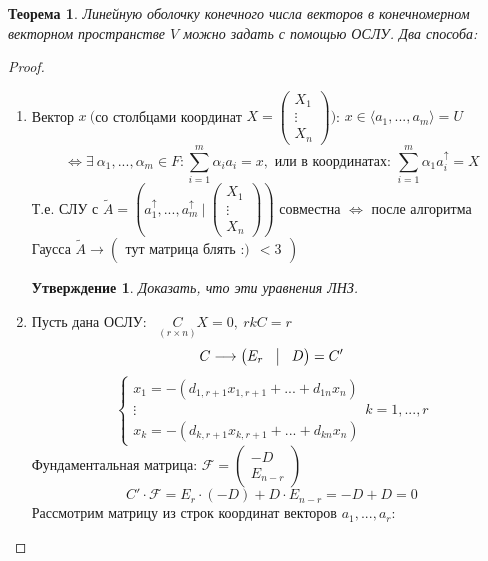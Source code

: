 \documentclass[a4paper, 12pt]{article}
\theoremstyle{definition}
\theoremstyle{plain}
\newtheorem*{theorem}{Теорема}
\newtheorem*{subtheorem}{Утверждение}
\theoremstyle{remark}
\begin{document}
  \begin{theorem}
    Линейную оболочку конечного числа векторов в конечномерном векторном пространстве $V$ можно задать с помощью ОСЛУ. Два способа:
  \end{theorem}
  \begin{proof}
    \begin{enumerate}
      \item Вектор $x \ ($со столбцами координат $X = \begin{pmatrix}
        X_1 \\ \vdots \\ X_n
      \end{pmatrix})$: $x \in \langle a_1,...,a_m \rangle = U$ 
      $$ \Longleftrightarrow \exists \ \alpha_1,...,\alpha_m \in F :  \sum \limits_{i=1}^m \alpha_i a_i = x,  \text{ или в координатах: } \sum \limits_{i=1}^m \alpha_1a_i^{\uparrow} = X$$
      Т.е. СЛУ с $\widetilde{A} = (a_1^{\uparrow},...,a_m^{\uparrow} \ | \ \begin{pmatrix}
        X_1 \\ \vdots \\ X_n \end{pmatrix})$ совместна $\Longleftrightarrow$ после алгоритма Гаусса $\widetilde{A} \longrightarrow \begin{pmatrix}
          \text{тут матрица блять :)} \ \ <3
        \end{pmatrix}$
        \begin{subtheorem}
          Доказать, что эти уравнения ЛНЗ.
        \end{subtheorem}
      \item Пусть дана ОСЛУ: \ $\underset{(r\times n)}{C} X = 0, \ rkC = r$
      $$C \longrightarrow \begin{pmatrix}
        E_r & \vline & D
      \end{pmatrix} = C'$$
      $$\begin{cases}
        x_1  = -(d_{1,r+1}x_{1,r+1}+...+d_{1n}x_n) \\
        \vdots \\
        x_k  = -(d_{k,r+1}x_{k,r+1}+...+d_{kn}x_n) 
      \end{cases} k = 1,...,r$$
      Фундаментальная матрица: $\mathcal{F} = \begin{pmatrix}
        -D \\ \hline E_{n-r}
      \end{pmatrix}$
      $$C' \cdot \mathcal{F} = E_r \cdot (-D) + D \cdot E_{n-r} = -D + D =0$$
      Рассмотрим матрицу из строк координат векторов $a_1,...,a_r$: 

\end{enumerate}
\end{proof}
\end{document}
